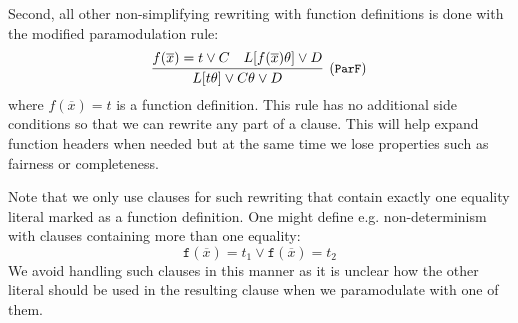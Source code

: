 Second, all other non-simplifying rewriting with function definitions is done with the modified paramodulation rule:
\begin{equation}
\infer[\small{(\texttt{ParF})}]{L[t\theta]\lor C\theta\lor D}{f(\overline{x})=t\lor C & L[f(\overline{x})\theta]\lor D}
\end{equation}
where $f(\overline{x})=t$ is a function definition. This rule has no additional side conditions so that we can rewrite any part of a clause. This will help expand function headers when needed but at the same time we lose properties such as fairness or completeness.

Note that we only use clauses for such rewriting that contain exactly one equality literal marked as a function definition. One might define e.g. non-determinism with clauses containing more than one equality:
$$\mathtt{f}(\overline{x})=t_1\lor \mathtt{f}(\overline{x})=t_2$$
We avoid handling such clauses in this manner as it is unclear how the other literal should be used in the resulting clause when we paramodulate with one of them.
